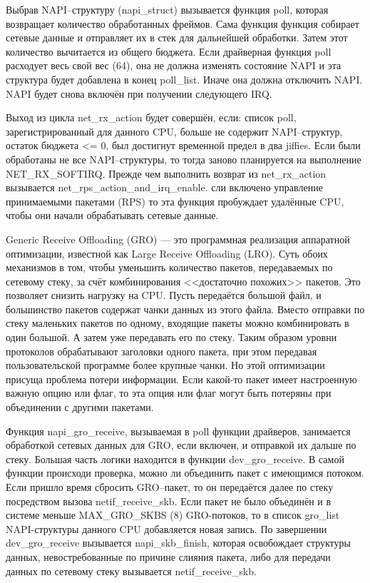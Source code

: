 Выбрав NAPI--структуру (napi\_struct)  вызывается функция poll, которая возвращает количество обработанных фреймов. Сама функция функция собирает сетевые данные и отправляет их в стек для дальнейшей обработки. Затем этот количество вычитается из общего бюджета. Если драйверная функция poll расходует весь свой вес (64), она не должна изменять состояние NAPI и эта структура будет добавлена в конец poll\_list. Иначе она должна отключить NAPI. NAPI будет снова включён при получении следующего IRQ.

Выход из цикла net\_rx\_action будет совершён, если: список poll, зарегистрированный для данного CPU, больше не содержит NAPI--структур, остаток бюджета <= 0, был достигнут временной предел в два jiffies. Если были обработаны не все NAPI--структуры, то тогда заново планируется на выполнение NET\_RX\_SOFTIRQ. Прежде чем выполнить возврат из net\_rx\_action вызывается net\_rps\_action\_and\_irq\_enable. сли включено управление принимаемыми пакетами (RPS) то эта функция пробуждает удалённые CPU, чтобы они начали обрабатывать сетевые данные.

Generic Receive Offloading (GRO) — это программная реализация аппаратной оптимизации, известной как Large Receive Offloading (LRO). Суть обоих механизмов в том, чтобы уменьшить количество пакетов, передаваемых по сетевому стеку, за счёт комбинирования <<достаточно похожих>> пакетов. Это позволяет снизить нагрузку на CPU. Пусть передаётся большой файл, и большинство пакетов содержат чанки данных из этого файла. Вместо отправки по стеку маленьких пакетов по одному, входящие пакеты можно комбинировать в один большой. А затем уже передавать его по стеку. Таким образом уровни протоколов обрабатывают заголовки одного пакета, при этом передавая пользовательской программе более крупные чанки. Но этой оптимизации присуща проблема потери информации. Если какой-то пакет имеет настроенную важную опцию или флаг, то эта опция или флаг могут быть потеряны при объединении с другими пакетами.

Функция napi\_gro\_receive, вызываемая в poll функции драйверов, занимается обработкой сетевых данных для GRO, если включен, и отправкой их дальше по стеку. Большая часть логики находится в функции dev\_gro\_receive. В самой функции происходи проверка, можно ли объединить пакет с имеющимся потоком. Если пришло время сбросить GRO--пакет, то он передаётся далее по стеку посредством вызова netif\_receive\_skb. Если пакет не было объединён и в системе меньше MAX\_GRO\_SKBS (8) GRO-потоков, то в список gro\_list NAPI-структуры данного CPU добавляется новая запись. По завершении dev\_gro\_receive вызывается napi\_skb\_finish, которая освобождает структуры данных, невостребованные по причине слияния пакета, либо для передачи данных по сетевому стеку вызывается netif\_receive\_skb.

